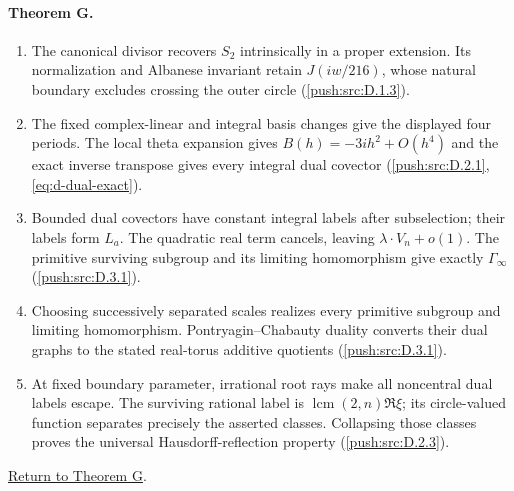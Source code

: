 \hypertarget{outline-I-G}{}
\paragraph{Theorem G.}
\begin{enumerate}[label=\arabic*.]
\item\hypertarget{step-I-G-1}{} The canonical divisor recovers
$S_2$ intrinsically in a proper extension.  Its normalization
and Albanese invariant retain $J(iw/216)$, whose natural boundary
excludes crossing the outer circle
(\hyperref[push:src:D.1.3]{\ref*{push:src:D.1.3}}).
\item\hypertarget{step-I-G-2}{} The fixed complex-linear and
integral basis changes give the displayed four periods.
The local theta expansion gives $B(h)=-3ih^2+O(h^4)$ and
the exact inverse transpose gives every integral dual covector
(\hyperref[push:src:D.2.1]{\ref*{push:src:D.2.1}},
\hyperref[eq:d-dual-exact]{\ref*{eq:d-dual-exact}}).
\item\hypertarget{step-I-G-3}{} Bounded dual covectors have
constant integral labels after subselection; their labels form
$L_a$.  The quadratic real term cancels, leaving
$\lambda\cdot V_n+o(1)$.  The primitive surviving subgroup and
its limiting homomorphism give exactly $\Gamma_\infty$
(\hyperref[push:src:D.3.1]{\ref*{push:src:D.3.1}}).
\item\hypertarget{step-I-G-4}{} Choosing successively separated
scales realizes every primitive subgroup and limiting
homomorphism.  Pontryagin--Chabauty duality converts their dual
graphs to the stated real-torus additive quotients
(\hyperref[push:src:D.3.1]{\ref*{push:src:D.3.1}}).
\item\hypertarget{step-I-G-5}{} At fixed boundary parameter,
irrational root rays make all noncentral dual labels escape.
The surviving rational label is
$\operatorname{lcm}(2,n)\Re\xi$; its circle-valued function
separates precisely the asserted classes.  Collapsing those
classes proves the universal Hausdorff-reflection property
(\hyperref[push:src:D.2.3]{\ref*{push:src:D.2.3}}).
\end{enumerate}
\hyperlink{main-I-G}{Return to Theorem G}.

